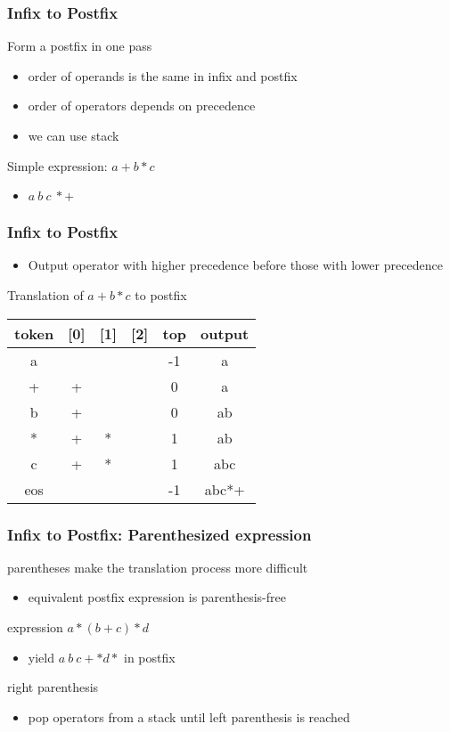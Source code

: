 \documentclass[newPxFont,sthlmFooter,nooffset]{beamer}
\begin{document}
\begin{frame}[t]
  \frametitle{Infix to Postfix}
Form a postfix in one pass
\begin{itemize}
\item order of operands is the same in infix and postfix
\item order of operators depends on precedence
\item we can use stack
\end{itemize}

Simple expression: $a+b*c$
\begin{itemize}
\item $a~ b~ c~ * +$
\end{itemize}
\end{frame}

\begin{frame}[t]
  \frametitle{Infix to Postfix}
  \begin{itemize}
  \item Output operator with higher precedence before those with lower precedence
  \end{itemize}

\bigskip
Translation of $a+b*c$ to postfix
  \begin{center}
    \begin{tabular}{c | c c c | c | c}
      token & [0] & [1] & [2] & top & output \\ \hline
      a &  &   &   & -1 & a \\
      + & + &  &  & 0 & a \\
      b & + & & & 0 & ab \\
      * & + & * & & 1 & ab \\
      c & + & * & & 1 & abc \\
      eos &  &  & & -1 & abc*+\\
    \end{tabular}
  \end{center}
\end{frame}

\begin{frame}[t]
  \frametitle{Infix to Postfix: Parenthesized expression}
parentheses make the translation process more difficult
\begin{itemize}
\item equivalent postfix expression is parenthesis-free
\end{itemize}

expression $a*(b+c)*d$
\begin{itemize}
\item yield $a~b~c+*d*$ in postfix
\end{itemize}

right parenthesis
\begin{itemize}
\item pop operators from a stack until left parenthesis is reached
\end{itemize}

\end{frame}
\end{document}
